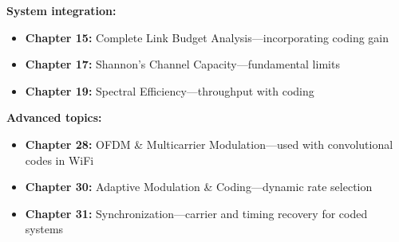 \textbf{System integration:}
\begin{itemize}
\item \textbf{Chapter 15:} Complete Link Budget Analysis---incorporating coding gain
\item \textbf{Chapter 17:} Shannon's Channel Capacity---fundamental limits
\item \textbf{Chapter 19:} Spectral Efficiency---throughput with coding
\end{itemize}

\textbf{Advanced topics:}
\begin{itemize}
\item \textbf{Chapter 28:} OFDM \& Multicarrier Modulation---used with convolutional codes in WiFi
\item \textbf{Chapter 30:} Adaptive Modulation \& Coding---dynamic rate selection
\item \textbf{Chapter 31:} Synchronization---carrier and timing recovery for coded systems
\end{itemize}
